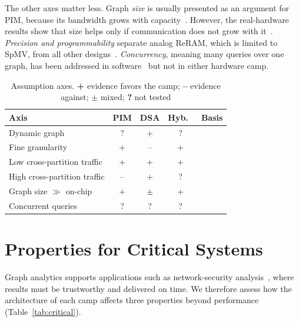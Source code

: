 \documentclass[journal,onecolumn]{IEEEtran}
\begin{document}
The other axes matter less. Graph \emph{size} is usually presented as an argument for PIM, because its bandwidth grows with capacity~\cite{ahn2015tesseract,zhuo2019graphq}. However, the real-hardware results show that size helps only if communication does not grow with it~\cite{gomezluna2022prim}. \emph{Precision and programmability} separate analog ReRAM, which is limited to SpMV, from all other designs~\cite{song2018graphr}. \emph{Concurrency}, meaning many queries over one graph, has been addressed in software~\cite{yin2023glign} but not in either hardware camp.

\begin{table}[t]
\caption{Assumption axes. \textbf{+} evidence favors the camp; \textbf{--} evidence against; $\pm$ mixed; \textbf{?} not tested}
\label{tab:axes}
\centering\footnotesize
\begin{tabularx}{\columnwidth}{@{}L{4.2cm}cccY@{}}
\toprule
Axis & PIM & DSA & Hyb.\ & Basis \\
\midrule
Dynamic graph & ? & + & ? & \cite{kim2020dynamic,rahman2021jetstream,gao2023mega,asquini2025tc} \\
Fine granularity & + & -- & + & \cite{shin2025piccolo,shin2025fala,yenimol2026cograf} \\
Low cross-partition traffic & + & + & + & \cite{gomezluna2022prim,cai2024pimpam} \\
High cross-partition traffic & -- & + & ? & \cite{gomezluna2022prim,barkhordar2025alphapim,zhuo2019graphq} \\
Graph size $\gg$ on-chip & + & $\pm$ & + & \cite{ahn2015tesseract,lee2022graphwave,chen2022regraph} \\
Concurrent queries & ? & ? & ? & \cite{yin2023glign} \\
\bottomrule
\end{tabularx}
\end{table}

\section{Properties for Critical Systems}\label{sec:critical}
Graph analytics supports applications such as network-security analysis~\cite{asquini2025tc}, where results must be trustworthy and delivered on time. We therefore assess how the architecture of each camp affects three properties beyond performance (Table~\ref{tab:critical}).
\end{document}
